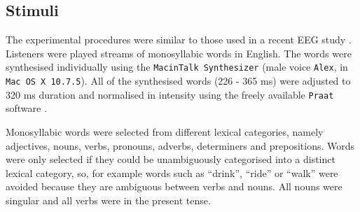 \documentclass[10pt,letterpaper]{article}
\newcommand{\citet}[1]{\cite{#1}}
\begin{document}
\subsection*{Stimuli}

The experimental procedures were similar to those used in a recent EEG
study \cite{DingEtAl2017}. Listeners were played streams of
monosyllabic words in English. The words were synthesised individually
using the \texttt{MacinTalk Synthesizer} (male voice \texttt{Alex}, in
\texttt{Mac OS X 10.7.5}). All of the synthesised words (226 - 365 ms)
were adjusted to 320 ms duration and normalised in intensity using the
freely available \texttt{Praat} software \citet{Praat}.

Monosyllabic words were selected from different lexical categories,
namely adjectives, nouns, verbs, pronouns, adverbs, determiners and
prepositions. Words were only selected if they could be unambiguously
categorised into a distinct lexical category, so, for example words
such as ``drink'', ``ride'' or ``walk'' were avoided because they are
ambiguous between verbs and nouns. All nouns were singular and all
verbs were in the present tense.
\end{document}
